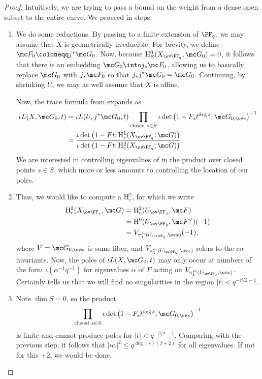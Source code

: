 \documentclass[../notes.tex]{subfiles}
\begin{document}
\begin{proof}
	Intuitively, we are trying to pass a bound on the weight from a dense open subset to the entire curve. We proceed in steps.
	\begin{enumerate}
		\item We do some reductions. By passing to a finite extension of $\FF_q$, we may assume that $X$ is geometrically irreducible. For brevity, we define $\mc F_0\coloneqq j^*\mc G_0$. Now, because $\mathrm H^0_S(X_{\ov\FF_q},\mc G_0)=0$, it follows that there is an embedding $\mc G_0\into j_*\mc F_0$, allowing us to basically replace $\mc G_0$ with $j_*\mc F_0$ so that $j_*j^*\mc G_0=\mc G_0$. Continuing, by shrinking $U$, we may as well assume that $X$ is affine.

		Now, the trace formula from  expands as
		\begin{align*}
			\iota L(X,\mc G_0,t) &= \iota L(U,j^*\mc G_0,t)\prod_{\text{closed }s\in S}\iota\det\left(1-F_st^{\deg s};\mc G_{0,\ov s}\right)^{-1} \\
			&= \frac{\iota\det\left(1-Ft;\mathrm H^1_c(X_{\ov\FF_q};\mc G)\right)}{\iota\det\left(1-Ft;\mathrm H^2_c(X_{\ov\FF_q};\mc G)\right)}.
		\end{align*}
		We are interested in controlling eigenvalues of in the product over closed points $s\in S$, which more or less amounts to controlling the location of our poles.

		\item Thus, we would like to compute a $\mathrm H^2_c$, for which we write
		\begin{align*}
			\mathrm H^2_c(X_{\ov\FF_q},\mc G) &= \mathrm H^2_c(U_{\ov\FF_q},\mc F) \\
			&= \mathrm H^0(U_{\ov\FF_q},\mc F^\lor)(-1) \\
			&= V_{\pi_1^{\mathrm{\acute et}}(U_{\ov\FF_q},\ov x)}(-1),
		\end{align*}
		where $V=\mc G_{0,\ov x}$ is some fiber, and $V_{\pi_1^{\mathrm{\acute et}}(U_{\ov\FF_q},\ov x)}$ refers to the co-invariants. Now, the poles of $\iota L(X,\mc G_0,t)$ may only occur at numbers of the form $\iota\left(\alpha^{-1}q^{-1}\right)$ for eigenvalues $\alpha$ of $F$ acting on $V_{\pi_1^{\mathrm{\acute et}}(U_{\ov\FF_q},\ov x)}$. Certainly  tells us that we will find no singularities in the region $\left|t\right|<q^{-\beta/2-1}$.

		\item Note $\dim S=0$, so the product
		\[\prod_{\text{closed }s\in S}\iota\det\left(1-F_st^{\deg s};\mc G_{0,\ov s}\right)^{-1}\]
		is finite and cannot produce poles for $\left|t\right|<q^{-\beta/2-1}$. Comparing with the previous step, it follows that $\left|\iota\alpha\right|^2\le q^{\deg(s)(\beta+2)}$ for all eigenvalues. If not for this $+2$, we would be done.


\end{enumerate}
\end{proof}
\end{document}
